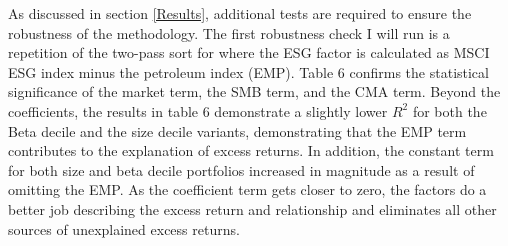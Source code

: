 As discussed in section \ref{Results}, additional tests are required to ensure the robustness of the methodology. The first robustness check I will run is a repetition of the two-pass sort for where the ESG factor is calculated as MSCI ESG index minus the petroleum index (EMP). Table 6 confirms the statistical significance of the market term, the SMB term, and the CMA term. Beyond the coefficients,  the results in table 6 demonstrate a slightly lower $R^2$ for both the Beta decile and the size decile variants, demonstrating that the EMP term contributes to the explanation of excess returns. In addition, the constant term for both size and beta decile portfolios increased in magnitude as a result of omitting the EMP. As the coefficient term gets closer to zero, the factors do a better job describing the excess return and relationship and eliminates all other sources of unexplained excess returns.  
 
